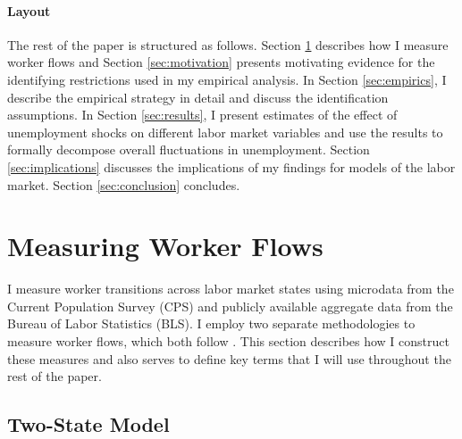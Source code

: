 \documentclass[12pt]{article}
\begin{document}
\paragraph{Layout} The rest of the paper is structured as follows. Section \ref{sec:data} describes how I measure worker flows and Section \ref{sec:motivation} presents motivating evidence for the identifying restrictions used in my empirical analysis. In Section \ref{sec:empirics}, I describe the empirical strategy in detail and discuss the identification assumptions. In Section \ref{sec:results}, I present estimates of the effect of unemployment shocks on different labor market variables and use the results to formally decompose overall fluctuations in unemployment. Section \ref{sec:implications} discusses the implications of my findings for models of the labor market. Section \ref{sec:conclusion} concludes.

\section{Measuring Worker Flows}\label{sec:data}

I measure worker transitions across labor market states using microdata from the Current Population Survey (CPS) and publicly available aggregate data from the Bureau of Labor Statistics (BLS). I employ two separate methodologies to measure worker flows, which both follow \cite{Shimer:2012aa}.  This section describes how I construct these measures and also serves to define key terms that I will use throughout the rest of the paper. 

\subsection{Two-State Model}
\end{document}
